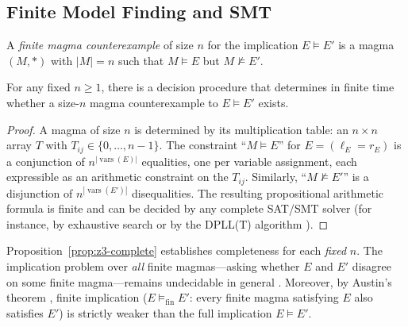 \subsection{Finite Model Finding and SMT}

\begin{definition}
A \emph{finite magma counterexample} of size $n$ for the implication $E \models E'$
is a magma $(M, *)$ with $|M| = n$ such that $M \models E$ but $M \not\models E'$.
\end{definition}

\begin{proposition}\label{prop:z3-complete}
For any fixed $n \geq 1$, there is a decision procedure that determines in finite
time whether a size-$n$ magma counterexample to $E \models E'$ exists.
\end{proposition}

\begin{proof}
A magma of size $n$ is determined by its multiplication table: an $n \times n$
array $T$ with $T_{ij} \in \{0,\ldots,n-1\}$.  The constraint ``$M \models E$''
for $E = (\ell_E = r_E)$ is a conjunction of $n^{|\operatorname{vars}(E)|}$ equalities, one
per variable assignment, each expressible as an arithmetic constraint on the
$T_{ij}$.  Similarly, ``$M \not\models E'$'' is a disjunction of $n^{|\operatorname{vars}(E')|}$
disequalities.  The resulting propositional arithmetic formula is finite and can be
decided by any complete SAT/SMT solver (for instance, by exhaustive search or by
the DPLL(T) algorithm \cite{demoura2008z3}).
\end{proof}

\begin{remark}
Proposition~\ref{prop:z3-complete} establishes completeness for each \emph{fixed}
$n$.  The implication problem over \emph{all} finite magmas---asking whether $E$
and $E'$ disagree on some finite magma---remains undecidable in general
\cite{mckenzie1971spectra}.  Moreover, by Austin's theorem \cite{austin1979equational},
finite implication ($E \models_\mathrm{fin} E'$: every finite magma satisfying $E$
also satisfies $E'$) is strictly weaker than the full implication $E \models E'$.
\end{remark}
